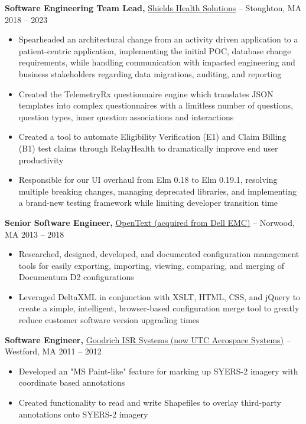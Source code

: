 \documentclass[10pt,letterpaper]{article}
\begin{document}
\textbf{Software Engineering Team Lead,} \href{https://www.fstl1992.com/}{Shields Health Solutions} -- Stoughton, MA \hfill 2018 -- 2023 \\
\vspace{-9pt}
\begin{itemize}
   \item Spearheaded an architectural change from an activity driven application to a patient-centric application, implementing the initial POC, database change requirements, while handling communication with impacted engineering and business stakeholders regarding data migrations, auditing, and reporting
  \item Created the TelemetryRx questionnaire engine which translates JSON templates into complex questionnaires with a limitless number of questions, question types, inner question associations and interactions
  \item Created a tool to automate Eligibility Verification (E1) and Claim Billing (B1) test claims through RelayHealth to dramatically improve end user productivity
  \item Responsible for our UI overhaul from Elm 0.18 to Elm 0.19.1, resolving multiple breaking changes, managing deprecated libraries, and implementing a brand-new testing framework while limiting developer transition time
\end{itemize}

\textbf{Senior Software Engineer,} \href{https://www.fstl1992.com/}{OpenText (acquired from Dell EMC)} -- Norwood, MA \hfill 2013 -- 2018 \\
\vspace{-9pt}
\begin{itemize}
  \item Researched, designed, developed, and documented configuration management tools for easily exporting, importing, viewing, comparing, and merging of Documentum D2 configurations
  \item Leveraged DeltaXML in conjunction with XSLT, HTML, CSS, and jQuery to create a simple, intelligent, browser-based configuration merge tool to greatly reduce customer software version upgrading times
\end{itemize}

\textbf{Software Engineer,} \href{https://www.fstl1992.com/}{Goodrich ISR Systems (now UTC Aerospace Systems)} -- Westford, MA \hfill 2011 -- 2012 \\
\vspace{-9pt}
\begin{itemize}
  \item Developed an "MS Paint-like" feature for marking up SYERS-2 imagery with coordinate based annotations
  \item Created functionality to read and write Shapefiles to overlay third-party annotations onto SYERS-2 imagery
\end{itemize}
\end{document}
